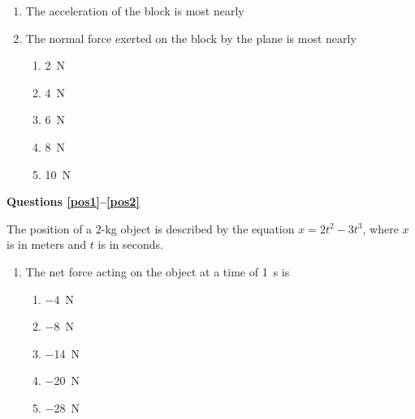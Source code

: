 \documentclass{../../../oss-classkick}
\begin{document}
\begin{multicols*}{2}
  \begin{enumerate}[resume,leftmargin=18pt]
  \item The acceleration of the block is most nearly
    \label{plane1}
    
  \item The normal force exerted on the block by the plane is most nearly
    \begin{enumerate}[nosep,leftmargin=18pt,label=(\Alph*)]
    \item\SI{2}{\newton}
    \item\SI{4}{\newton}
    \item\SI{6}{\newton}
    \item\SI{8}{\newton}
    \item\SI{10}{\newton}
    \end{enumerate}
    \label{plane2}
  \end{enumerate}
  
  \textbf{Questions \ref{pos1}--\ref{pos2}}

  The position of a 2-kg object is described by the equation
  $x=2t^2-3t^3$, where $x$ is in meters and $t$ is in seconds.
  \begin{enumerate}[resume,leftmargin=18pt]
  \item The net force acting on the object at a time of \SI{1}{s} is
    \begin{enumerate}[nosep,leftmargin=18pt,label=(\Alph*)]
    \item\SI{-4}\newton
    \item\SI{-8}\newton
    \item\SI{-14}\newton
    \item\SI{-20}\newton
    \item\SI{-28}\newton
    \end{enumerate}
    \label{pos1}
    

\end{enumerate}
\end{multicols*}
\end{document}
